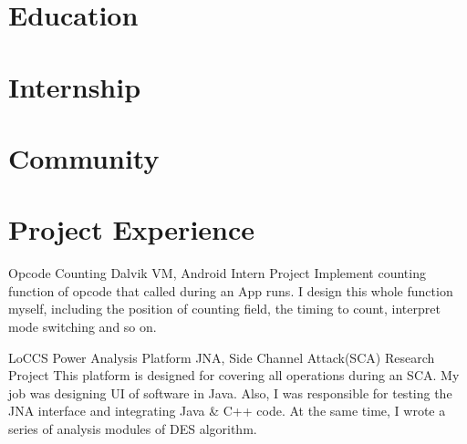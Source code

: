 \documentclass[11pt,a4paper]{moderncv}
\begin{document}
\maketitle

\section{Education}


\section{Internship}

\section{Community}

\section{Project Experience}
{Opcode Counting}
{Dalvik VM, Android}
{Intern Project}{}
{
Implement counting function of opcode that called during an App runs. 
I design this whole function myself, including the position of counting field, the timing to count, interpret mode switching and so on.
}

{LoCCS Power Analysis Platform}
{JNA, Side Channel Attack(SCA)}
{Research Project}{}
{
This platform is designed for covering all operations during an SCA.
My job was designing UI of software in Java.
Also, I was responsible for testing the JNA interface and integrating Java \& C++ code.
At the same time, I wrote a series of analysis modules of DES algorithm.
}
\end{document}
